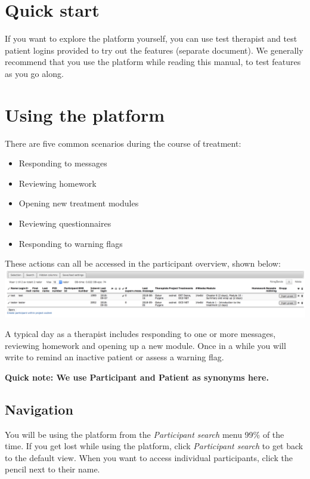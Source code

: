 \documentclass[]{book}
\providecommand{\tightlist}{%
  \setlength{\itemsep}{0pt}\setlength{\parskip}{0pt}}
\theoremstyle{definition}
\theoremstyle{definition}
\theoremstyle{definition}
\theoremstyle{remark}
\begin{document}
\hypertarget{quick-start}{%
\section{Quick start}\label{quick-start}}

If you want to explore the platform yourself, you can use test therapist
and test patient logins provided to try out the features (separate
document). We generally recommend that you use the platform while
reading this manual, to test features as you go along.

\hypertarget{using-the-platform}{%
\section{Using the platform}\label{using-the-platform}}

There are five common scenarios during the course of treatment:

\begin{itemize}
\tightlist
\item
  Responding to messages
\item
  Reviewing homework
\item
  Opening new treatment modules
\item
  Reviewing questionnaires
\item
  Responding to warning flags
\end{itemize}

These actions can all be accessed in the participant overview, shown
below: \includegraphics{images/participant-overview.png}

A typical day as a therapist includes responding to one or more
messages, reviewing homework and opening up a new module. Once in a
while you will write to remind an inactive patient or assess a warning
flag.

\textbf{Quick note: We use Participant and Patient as synonyms here.}

\hypertarget{navigation}{%
\subsection{Navigation}\label{navigation}}

You will be using the platform from the \emph{Participant search} menu
99\% of the time. If you get lost while using the platform, click
\emph{Participant search} to get back to the default view. When you want
to access individual participants, click the pencil next to their name.
\end{document}
